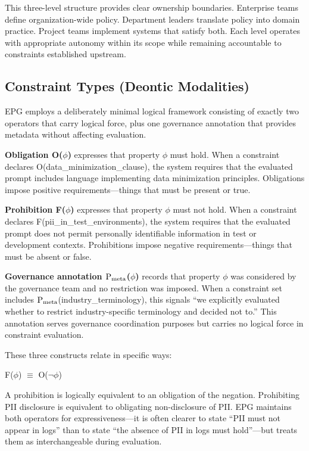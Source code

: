 This three-level structure provides clear ownership boundaries. Enterprise teams define organization-wide policy. Department leaders translate policy into domain practice. Project teams implement systems that satisfy both. Each level operates with appropriate autonomy within its scope while remaining accountable to constraints established upstream.

\subsection{Constraint Types (Deontic Modalities)}


EPG employs a deliberately minimal logical framework consisting of exactly two operators that carry logical force, plus one governance annotation that provides metadata without affecting evaluation.

\textbf{Obligation O($\phi$)} expresses that property $\phi$ must hold. When a constraint declares O(data\_\allowbreak{}minimization\_\allowbreak{}clause), the system requires that the evaluated prompt includes language implementing data minimization principles. Obligations impose positive requirements---things that must be present or true.

\textbf{Prohibition F($\phi$)} expresses that property $\phi$ must not hold. When a constraint declares F(pii\_\allowbreak{}in\_\allowbreak{}test\_\allowbreak{}environments), the system requires that the evaluated prompt does not permit personally identifiable information in test or development contexts. Prohibitions impose negative requirements---things that must be absent or false.

\textbf{Governance annotation $\mathrm{P_{meta}}$($\phi$)} records that property $\phi$ was considered by the governance team and no restriction was imposed. When a constraint set includes $\mathrm{P_{meta}}$(industry\_\allowbreak{}terminology), this signals ``we explicitly evaluated whether to restrict industry-specific terminology and decided not to.'' This annotation serves governance coordination purposes but carries no logical force in constraint evaluation.

These three constructs relate in specific ways:

\begin{claddisp}
F($\phi$) $\equiv$ O($\neg$$\phi$)
\end{claddisp}


A prohibition is logically equivalent to an obligation of the negation. Prohibiting PII disclosure is equivalent to obligating non-disclosure of PII. EPG maintains both operators for expressiveness---it is often clearer to state ``PII must not appear in logs'' than to state ``the absence of PII in logs must hold''---but treats them as interchangeable during evaluation.

